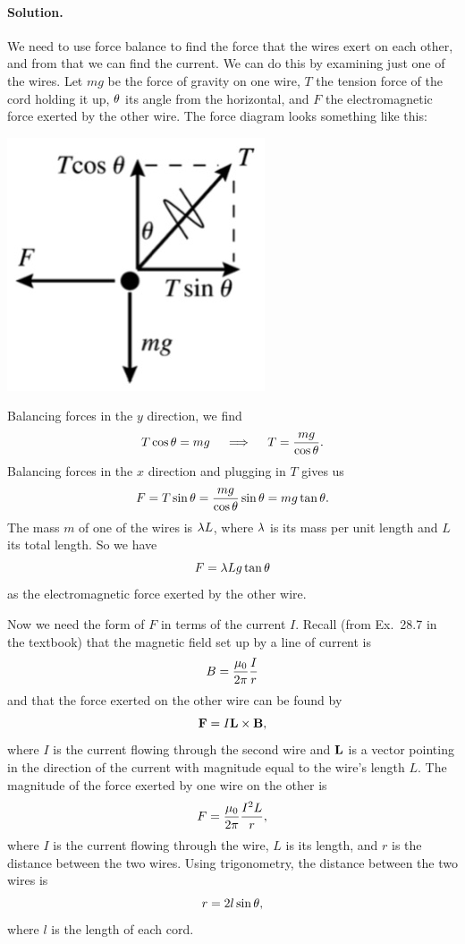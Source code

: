 \documentclass[11pt]{article}
\newcommand{\beq}{\begin{equation*}}
\newcommand{\eeq}{\end{equation*}}
\newenvironment{solution}
{
    \paragraph{Solution.}
    \ignorespaces
}
{
    \bigskip
}
\newcommand{\qimplies}{\quad \implies \quad}
\begin{document}
\begin{solution}
	We need to use force balance to find the force that the wires exert on each other, and from that we can find the current.  We can do this by examining just one of the wires.  Let $m g$ be the force of gravity on one wire, $T$ the tension force of the cord holding it up, $\theta$ its angle from the horizontal, and $F$ the electromagnetic force exerted by the other wire.  The force diagram looks something like this:
	
	\begin{center} \includegraphics[scale=.4]{P28-61a.jpeg} \end{center}
	
	Balancing forces in the $y$ direction, we find
	\beq
		T \cos\tht = mg
		\qimplies
		T = \frac{m g}{\cos\tht}.
	\eeq
	Balancing forces in the $x$ direction and plugging in $T$ gives us
	\beq
		F = T \sin\tht = \frac{mg}{\cos\tht} \sin\tht = mg \tan\tht.
	\eeq
	The mass $m$ of one of the wires is $\lambda L$, where $\lambda$ is its mass per unit length and $L$ its total length.  So we have
	\beq
		F = \lam L g \tan\tht
	\eeq
	as the electromagnetic force exerted by the other wire.
	
	Now we need the form of $F$ in terms of the current $I$.  Recall (from Ex.~28.7 in the textbook) that the magnetic field set up by a line of current is
	\beq
		B = \frac{\muo}{2\pi} \frac{I}{r}
	\eeq
	and that the force exerted on the other wire can be found by
	\beq
		\vF = I \vL \times \vB,
	\eeq
	where $I$ is the current flowing through the second wire and $\vb{L}$ is a vector pointing in the direction of the current with magnitude equal to the wire's length $L$.  The magnitude of the force exerted by one wire on the other is
	\beq
		F = \frac{\muo}{2\pi} \frac{I^2 L}{r},
	\eeq
	where $I$ is the current flowing through the wire, $L$ is its length, and $r$ is the distance between the two wires.  Using trigonometry, the distance between the two wires is
	\beq
		r = 2 l \sin\tht,
	\eeq
	where $l$ is the length of each cord.
	

\end{solution}
\end{document}
